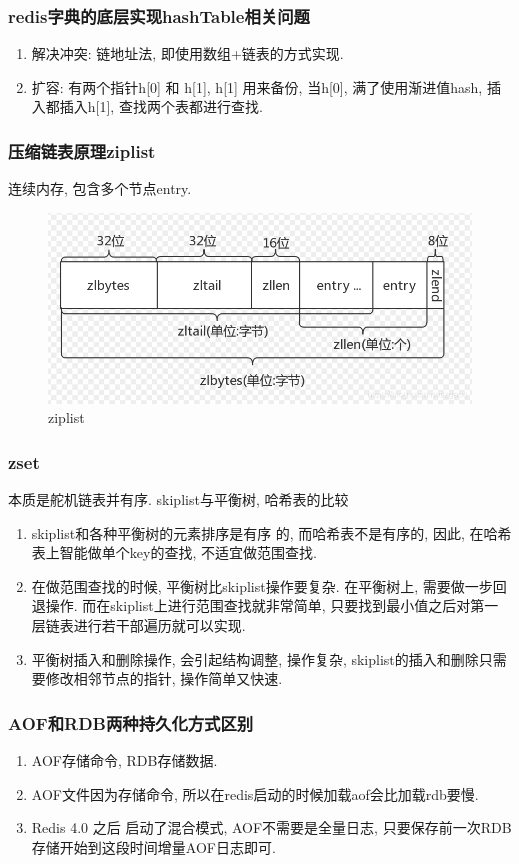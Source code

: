 \documentclass[UTF8]{ctexart}
\begin{document}
\subsubsection{redis字典的底层实现hashTable相关问题}
\begin{enumerate}
	\item 解决冲突: 链地址法, 即使用数组+链表的方式实现.
	\item 扩容: 有两个指针h[0] 和 h[1], h[1] 用来备份, 当h[0], 满了使用渐进值hash, 插入都插入h[1], 查找两个表都进行查找.
\end{enumerate}
\subsubsection{压缩链表原理ziplist}
连续内存, 包含多个节点entry.
\begin{figure}
	\centering
	\includegraphics[width=0.7\linewidth]{figures/ziplist.png}
	\caption{ziplist}
	\label{fig:ziplist}
\end{figure}
\subsubsection{zset}
本质是舵机链表并有序.
skiplist与平衡树, 哈希表的比较
\begin{enumerate}
	\item skiplist和各种平衡树的元素排序是有序 的, 而哈希表不是有序的, 因此, 在哈希表上智能做单个key的查找, 不适宜做范围查找.
	\item 在做范围查找的时候, 平衡树比skiplist操作要复杂. 在平衡树上, 需要做一步回退操作. 而在skiplist上进行范围查找就非常简单, 只要找到最小值之后对第一层链表进行若干部遍历就可以实现.
	\item 平衡树插入和删除操作, 会引起结构调整, 操作复杂, skiplist的插入和删除只需要修改相邻节点的指针, 操作简单又快速.
\end{enumerate}

\subsubsection{AOF和RDB两种持久化方式区别}
\begin{enumerate}
	\item AOF存储命令, RDB存储数据.
	\item AOF文件因为存储命令, 所以在redis启动的时候加载aof会比加载rdb要慢.
	\item Redis 4.0 之后 启动了混合模式, AOF不需要是全量日志, 只要保存前一次RDB存储开始到这段时间增量AOF日志即可.
\end{enumerate}
\end{document}
